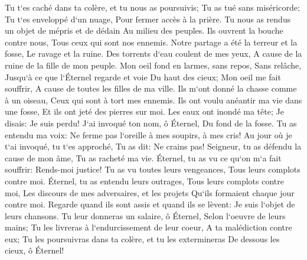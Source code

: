 \verse Tu t`es caché dans ta colère, et tu nous as poursuivis; Tu as tué sans miséricorde; 
\verse Tu t`es enveloppé d`un nuage, Pour fermer accès à la prière. 
\verse Tu nous as rendus un objet de mépris et de dédain Au milieu des peuples. 
\verse Ils ouvrent la bouche contre nous, Tous ceux qui sont nos ennemis. 
\verse Notre partage a été la terreur et la fosse, Le ravage et la ruine. 
\verse Des torrents d`eau coulent de mes yeux, A cause de la ruine de la fille de mon peuple. 
\verse Mon oeil fond en larmes, sans repos, Sans relâche, 
\verse Jusqu`à ce que l`Éternel regarde et voie Du haut des cieux; 
\verse Mon oeil me fait souffrir, A cause de toutes les filles de ma ville. 
\verse Ils m`ont donné la chasse comme à un oiseau, Ceux qui sont à tort mes ennemis. 
\verse Ils ont voulu anéantir ma vie dans une fosse, Et ils ont jeté des pierres sur moi. 
\verse Les eaux ont inondé ma tête; Je disais: Je suis perdu! 
\verse J`ai invoqué ton nom, ô Éternel, Du fond de la fosse. 
\verse Tu as entendu ma voix: Ne ferme pas l`oreille à mes soupirs, à mes cris! 
\verse Au jour où je t`ai invoqué, tu t`es approché, Tu as dit: Ne crains pas! 
\verse Seigneur, tu as défendu la cause de mon âme, Tu as racheté ma vie. 
\verse Éternel, tu as vu ce qu`on m`a fait souffrir: Rends-moi justice! 
\verse Tu as vu toutes leurs vengeances, Tous leurs complots contre moi. 
\verse Éternel, tu as entendu leurs outrages, Tous leurs complots contre moi, 
\verse Les discours de mes adversaires, et les projets Qu`ils formaient chaque jour contre moi. 
\verse Regarde quand ils sont assis et quand ils se lèvent: Je suis l`objet de leurs chansons. 
\verse Tu leur donneras un salaire, ô Éternel, Selon l`oeuvre de leurs mains; 
\verse Tu les livreras à l`endurcissement de leur coeur, A ta malédiction contre eux; 
\verse Tu les poursuivras dans ta colère, et tu les extermineras De dessous les cieux, ô Éternel! 

